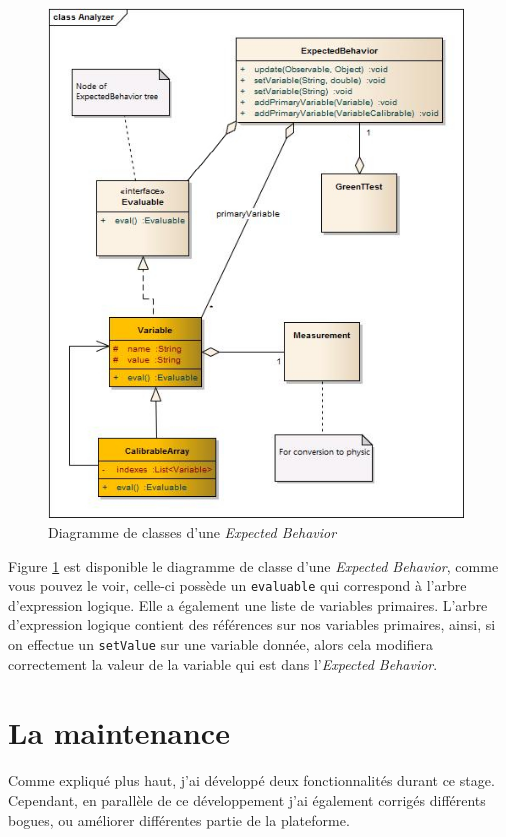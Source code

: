 \begin{figure}[H]
\centering
\includegraphics[width=11.0cm]{contents/images/eb.jpg}
\caption{Diagramme de classes d'une \textit{Expected Behavior}}
\label{fig:ebClasses}
\end{figure}
Figure \ref{fig:ebClasses} est disponible le diagramme de classe d'une \textit{Expected Behavior}, comme vous pouvez le voir, celle-ci possède un \texttt{evaluable} qui correspond à l'arbre d'expression logique. Elle a également une liste de variables primaires. L'arbre d'expression logique contient des références sur nos variables primaires, ainsi, si on effectue un \texttt{setValue} sur une variable donnée, alors cela modifiera correctement la valeur de la variable qui est dans l'\textit{Expected Behavior}.
\section{La maintenance}
Comme expliqué plus haut, j'ai développé deux fonctionnalités durant ce stage. Cependant, en parallèle de ce développement j'ai également corrigés différents bogues, ou améliorer différentes partie de la plateforme.

